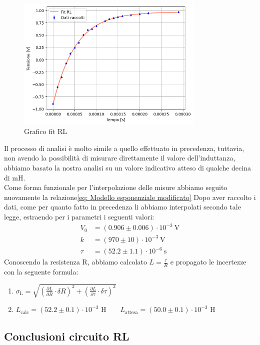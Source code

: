\documentclass[letterpaper,12pt]{article}
\begin{document}
\begin{figure}[h] 
  \centering
  \includegraphics[width=0.8\textwidth]{RL.png} %
  \caption{Grafico fit RL}
  \label{fig:fitRL}
\end{figure} 
Il processo di analisi è molto simile a quello effettuato in precedenza, tuttavia, non avendo la possibilità di misurare direttamente il valore dell'induttanza, abbiamo basato la nostra analisi su un valore indicativo atteso di qualche decina di mH.\\
Come forma funzionale per l'interpolazione delle misure abbiamo seguito nuovamente la relazione\eqref{eq: Modello esponenziale modificato}
Dopo aver raccolto i dati, come per quanto fatto in precedenza li abbiamo interpolati secondo tale legge, estraendo per i parametri i seguenti valori:
\begin{align*}
    V_0 &= ( 0.906\pm0.006 )\cdot 10^{-3}\ \text{V} \\
    k &= (970 \pm 10)\cdot 10^{-3}\ \text{V} \\
    \tau &= (52.2 \pm 1.1) \cdot 10^{-6}\ \text{s} 
\end{align*} 
Conoscendo la resistenza R, abbiamo calcolato $L = \frac{\tau}{R}$ e propagato le incertezze con la seguente formula:
\begin{enumerate}
    \item $\sigma_\text{L} = \sqrt{(\frac{\partial L}{\partial R} \cdot \delta R)^2 + (\frac{\partial L}{\partial \tau}\cdot \delta \tau)^2} $
    \item $ L_\text{calc}= (52.2 \pm 0.1) \cdot 10^{-3} \text{ H} \qquad L_\text{attesa}= (50.0 \pm 0.1) \cdot 10^{-3} \text{ H}$
\end{enumerate}

\subsection{Conclusioni circuito RL}
\end{document}

